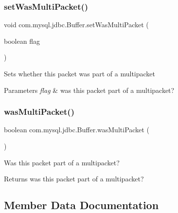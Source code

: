 \subsubsection{\texorpdfstring{set\+Was\+Multi\+Packet()}{setWasMultiPacket()}}
{\footnotesize\ttfamily void com.\+mysql.\+jdbc.\+Buffer.\+set\+Was\+Multi\+Packet (\begin{DoxyParamCaption}\item[{boolean}]{flag }\end{DoxyParamCaption})}

Sets whether this packet was part of a multipacket


\begin{DoxyParams}{Parameters}
{\em flag} & was this packet part of a multipacket? \\
\hline
\end{DoxyParams}
\mbox{\label{classcom_1_1mysql_1_1jdbc_1_1_buffer_a3fce81ada28c621352873af28ff8e1fb}} 
\subsubsection{\texorpdfstring{was\+Multi\+Packet()}{wasMultiPacket()}}
{\footnotesize\ttfamily boolean com.\+mysql.\+jdbc.\+Buffer.\+was\+Multi\+Packet (\begin{DoxyParamCaption}{ }\end{DoxyParamCaption})}

Was this packet part of a multipacket?

\begin{DoxyReturn}{Returns}
was this packet part of a multipacket? 
\end{DoxyReturn}


\subsection{Member Data Documentation}
\mbox{\label{classcom_1_1mysql_1_1jdbc_1_1_buffer_a56f21b391ad7591e2ea8fb3661b69ddf}} 
